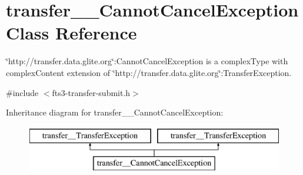 \section{transfer\_\-\_\-CannotCancelException Class Reference}
\label{classtransfer____CannotCancelException}


\char`\"{}http://transfer.data.glite.org\char`\"{}:CannotCancelException is a complexType with complexContent extension of \char`\"{}http://transfer.data.glite.org\char`\"{}:TransferException.  




{\ttfamily \#include $<$fts3-\/transfer-\/submit.h$>$}

Inheritance diagram for transfer\_\-\_\-CannotCancelException:\begin{figure}[H]
\begin{center}
\leavevmode
\includegraphics[height=2.000000cm]{classtransfer____CannotCancelException}
\end{center}
\end{figure}
